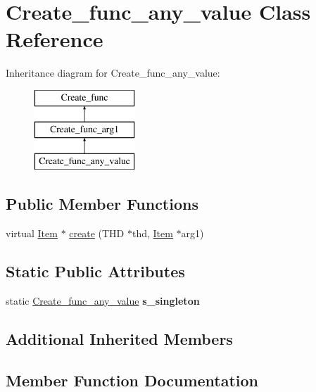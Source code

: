 \hypertarget{classCreate__func__any__value}{}\section{Create\+\_\+func\+\_\+any\+\_\+value Class Reference}
\label{classCreate__func__any__value}
Inheritance diagram for Create\+\_\+func\+\_\+any\+\_\+value\+:\begin{figure}[H]
\begin{center}
\leavevmode
\includegraphics[height=3.000000cm]{classCreate__func__any__value}
\end{center}
\end{figure}
\subsection*{Public Member Functions}
\begin{DoxyCompactItemize}
\item 
virtual \mbox{\hyperlink{classItem}{Item}} $\ast$ \mbox{\hyperlink{classCreate__func__any__value_a25afb44b47f80c3df0d3e252802b946c}{create}} (T\+HD $\ast$thd, \mbox{\hyperlink{classItem}{Item}} $\ast$arg1)
\end{DoxyCompactItemize}
\subsection*{Static Public Attributes}
\begin{DoxyCompactItemize}
\item 
\mbox{\label{classCreate__func__any__value_a9fbd58c1483be012a7c13824249b17e8}} 
static \mbox{\hyperlink{classCreate__func__any__value}{Create\+\_\+func\+\_\+any\+\_\+value}} {\bfseries s\+\_\+singleton}
\end{DoxyCompactItemize}
\subsection*{Additional Inherited Members}


\subsection{Member Function Documentation}
\mbox{\label{classCreate__func__any__value_a25afb44b47f80c3df0d3e252802b946c}} 
